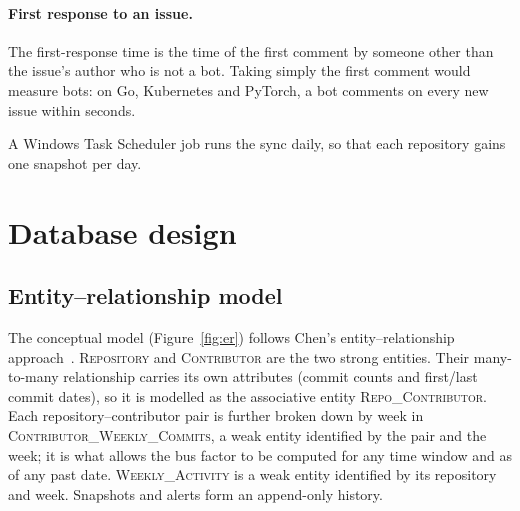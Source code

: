 \documentclass[11pt,a4paper]{report}
\begin{document}
\paragraph{First response to an issue.} The first-response time is the time of
the first comment by someone other than the issue's author who is not a bot.
Taking simply the first comment would measure bots: on Go, Kubernetes and
PyTorch, a bot comments on every new issue within seconds.

A Windows Task Scheduler job runs the sync daily, so that each repository gains
one snapshot per day.

\section{Database design}

\subsection{Entity--relationship model}

The conceptual model (Figure~\ref{fig:er}) follows Chen's entity--relationship
approach~\cite{chen1976er}. \textsc{Repository} and \textsc{Contributor} are the
two strong entities. Their many-to-many relationship carries its own
attributes (commit counts and first/last commit dates), so it is modelled as
the associative entity \textsc{Repo\_Contributor}. Each repository--contributor
pair is further broken down by week in \textsc{Contributor\_Weekly\_Commits},
a weak entity identified by the pair and the week; it is what allows the bus
factor to be computed for any time window and as of any past date.
\textsc{Weekly\_Activity} is a weak entity identified by its repository and
week. Snapshots and alerts form an append-only history.
\end{document}
